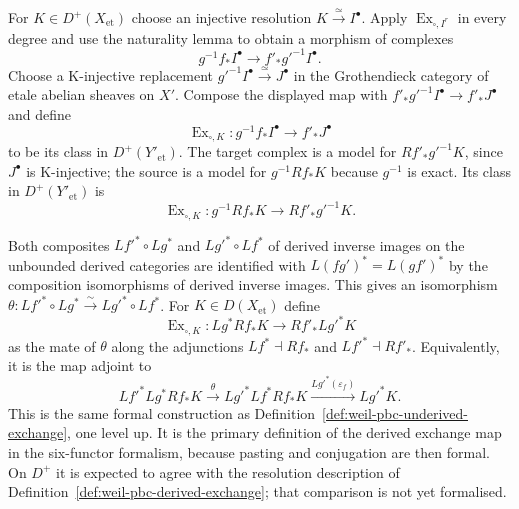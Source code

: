 \begin{definition}
\label{def:weil-pbc-derived-exchange}
\leanok
For $K\in D^+(X_{\mathrm{et}})$ choose an injective resolution
$K\xrightarrow{\simeq}I^\bullet$.  Apply
$\operatorname{Ex}_{\square,I^r}$ in every degree and use the naturality
lemma to obtain a morphism of complexes
\[ 
 g^{-1}f_*I^\bullet\longrightarrow f'_*g'^{-1}I^\bullet.
\]
Choose a K-injective replacement
$g'^{-1}I^\bullet\xrightarrow{\simeq}J^\bullet$ in the Grothendieck
category of etale abelian sheaves on $X'$.  Compose the displayed map with
$f'_*g'^{-1}I^\bullet\to f'_*J^\bullet$ and define
\[
 \operatorname{Ex}_{\square,K}:g^{-1}f_*I^\bullet\longrightarrow f'_*J^\bullet
\]
to be its class in $D^+(Y'_{\mathrm{et}})$.  The target complex is a model
for $Rf'_*g'^{-1}K$, since $J^\bullet$ is K-injective; the source is a model
for $g^{-1}Rf_*K$ because $g^{-1}$ is exact.
Its class in $D^+(Y'_{\mathrm{et}})$ is
\[
 \operatorname{Ex}_{\square,K}:g^{-1}Rf_*K\longrightarrow
 Rf'_*g'^{-1}K.
\]
\end{definition}


\begin{definition}
\label{def:weil-pbc-derived-exchange-unbounded}
\leanok
Both composites $Lf'^*\circ Lg^*$ and $Lg'^*\circ Lf^*$ of derived
inverse images on the unbounded derived categories are identified with
$L(fg')^*=L(gf')^*$ by the composition isomorphisms of derived inverse
images.  This gives an isomorphism
$\theta:Lf'^*\circ Lg^*\xrightarrow{\sim}Lg'^*\circ Lf^*$.  For
$K\in D(X_{\mathrm{et}})$ define
\[
 \operatorname{Ex}_{\square,K}:Lg^*Rf_*K\longrightarrow Rf'_*Lg'^*K
\]
as the mate of $\theta$ along the adjunctions $Lf^*\dashv Rf_*$ and
$Lf'^*\dashv Rf'_*$.  Equivalently, it is the map adjoint to
\[
 Lf'^*Lg^*Rf_*K\xrightarrow{\theta}Lg'^*Lf^*Rf_*K
 \xrightarrow{Lg'^*(\varepsilon_f)}Lg'^*K.
\]
This is the same formal construction as
Definition~\ref{def:weil-pbc-underived-exchange}, one level up.  It is
the primary definition of the derived exchange map in the six-functor
formalism, because pasting and conjugation are then formal.  On $D^+$ it
is expected to agree with the resolution description of
Definition~\ref{def:weil-pbc-derived-exchange}; that comparison is not
yet formalised.
\end{definition}


